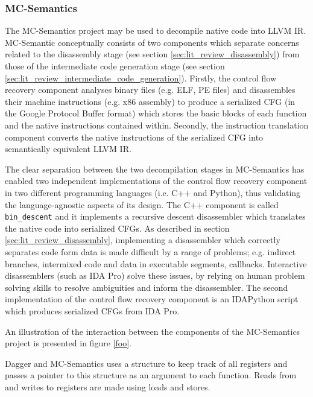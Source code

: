 
\subsubsection{MC-Semantics}
\label{sec:rel_work_mc-semantics}

The MC-Semantics project may be used to decompile native code into LLVM IR. MC-Semantic conceptually consists of two components which separate concerns related to the disassembly stage (see section \ref{sec:lit_review_disassembly}) from those of the intermediate code generation stage (see section \ref{sec:lit_review_intermediate_code_generation}). Firstly, the control flow recovery component analyses binary files (e.g. ELF, PE files) and disassembles their machine instructions (e.g. x86 assembly) to produce a serialized CFG (in the Google Protocol Buffer format) which stores the basic blocks of each function and the native instructions contained within. Secondly, the instruction translation component converts the native instructions of the serialized CFG into semantically equivalent LLVM IR.

The clear separation between the two decompilation stages in MC-Semantics has enabled two independent implementations of the control flow recovery component in two different programming languages (i.e. C++ and Python), thus validating the language-agnostic aspects of its design. The C++ component is called \texttt{bin_descent} and it implements a recursive descent disassembler which translates the native code into serialized CFGs. As described in section \ref{sec:lit_review_disassembly}, implementing a disassembler which correctly separates code form data is made difficult by a range of problems; e.g. indirect branches, intermixed code and data in executable segments, callbacks. Interactive disassemblers (such as IDA Pro) solve these issues, by relying on human problem solving skills to resolve ambiguities and inform the disassembler. The second implementation of the control flow recovery component is an IDAPython script which produces serialized CFGs from IDA Pro.


An illustration of the interaction between the components of the MC-Semantics project is presented in figure \ref{foo}.

Dagger and MC-Semantics uses a structure to keep track of all registers and passes a pointer to this structure as an argument to each function. Reads from and writes to registers are made using loads and stores.

